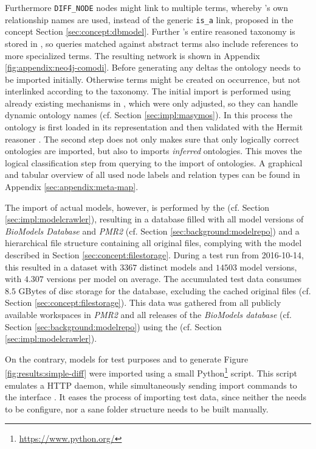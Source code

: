 Furthermore \texttt{DIFF\_NODE} nodes might link to multiple \comodi terms, whereby \comodi's own relationship names are used, instead of the generic \texttt{is\_a} link, proposed in the concept Section \ref{sec:concept:dbmodel}.
Further \comodi's entire reasoned taxonomy is stored in \masymos, so queries matched against abstract terms also include references to more specialized terms. The resulting network is shown in Appendix \ref{fig:appendix:neo4j-comodi}.
Before generating any deltas the \comodi ontology needs to be imported initially. Otherwise terms might be created on occurrence, but not interlinked according to the taxonomy.
The initial import is performed using already existing mechanisms in \masymos, which were only adjusted, so they can handle dynamic ontology names (cf. Section \ref{sec:impl:masymos}). In this process the ontology is first loaded in its \owl representation and then validated with the Hermit reasoner \citep{Shearer2008}. The second step does not only makes sure that only logically correct ontologies are imported, but also to imports \emph{inferred} ontologies. This moves the logical classification step from querying to the import of ontologies.
A graphical and tabular overview of all used node labels and relation types can be found in Appendix \ref{sec:appendix:meta-map}.

The import of actual models, however, is performed by the \modelcrawler (cf. Section \ref{sec:impl:modelcrawler}), resulting in a \masymos database filled with all model versions of \emph{BioModels Database} and \emph{PMR2} (cf. Section \ref{sec:background:modelrepo}) and a hierarchical file structure containing all original files, complying with the model described in Section \ref{sec:concept:filestorage}.
During a test run from 2016-10-14, this resulted in a dataset with $3367$ distinct models and  $14503$ model versions, with $4.307$ versions per model on average. The accumulated test data consumes $8.5$ GBytes of disc storage for the database, excluding the cached original files (cf. Section \ref{sec:concept:filestorage}).
This data was gathered from all publicly available workspaces in \emph{PMR2} and all releases of the \emph{BioModels database} (cf. Section \ref{sec:background:modelrepo}) using the \modelcrawler (cf. Section \ref{sec:impl:modelcrawler}).

On the contrary, models for test purposes and to generate Figure \ref{fig:results:simple-diff} were imported using a small Python\footnote{\url{https://www.python.org/}} script. This script emulates a HTTP daemon, while simultaneously sending import commands to the \masymos \rest interface \morre. It eases the process of importing test data, since neither the \modelcrawler needs to be configure, nor a sane folder structure needs to be built manually.

